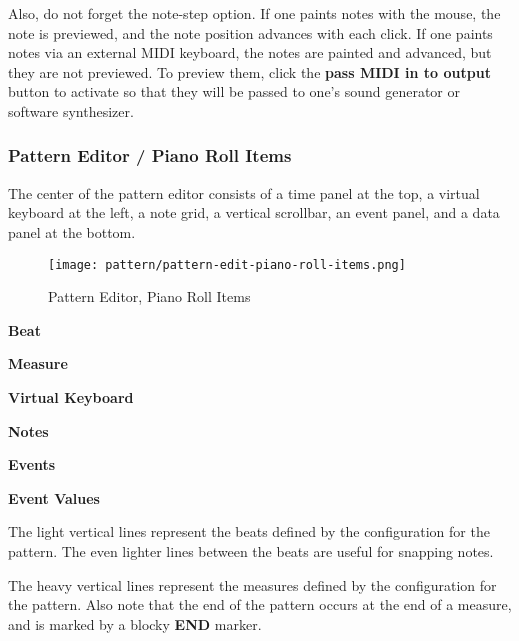   Also, do not forget the note-step option.  If one paints notes with the mouse,
   the note is previewed, and the note position advances with each click.  If
   one paints notes via an external MIDI keyboard, the notes are painted and
   advanced, but they are not previewed.  To preview them, click the
   \textbf{pass MIDI in to output} button to activate so that they will be
   passed to one's sound generator or software synthesizer.

\subsubsection{Pattern Editor / Piano Roll Items}
\label{subsubsec:seq64_pattern_editor_piano_roll_items}

   The center of the pattern editor consists of a time panel at the top,
   a virtual keyboard at the left, a note grid, a vertical scrollbar, an event
   panel, and a data panel at the bottom.

\begin{figure}[H]
   \centering 
   \texttt{[image: pattern/pattern-edit-piano-roll-items.png]}
   \caption{Pattern Editor, Piano Roll Items}
   \label{fig:pattern_editor_piano_roll_items}
\end{figure}

   \begin{enumber}
      \item \textbf{Beat}
      \item \textbf{Measure}
      \item \textbf{Virtual Keyboard}
      \item \textbf{Notes}
      \item \textbf{Events}
      \item \textbf{Event Values}
   \end{enumber}

   \setcounter{ItemCounter}{0}      %

   The light vertical lines represent the beats defined by the configuration
   for the pattern.  The even lighter lines between the beats are useful for
   snapping notes.

   The heavy vertical lines represent the measures defined by the
   configuration for the pattern.
   Also note that the end of the pattern
   occurs at the end of a measure, and is marked by a blocky \textbf{END}
   marker.

